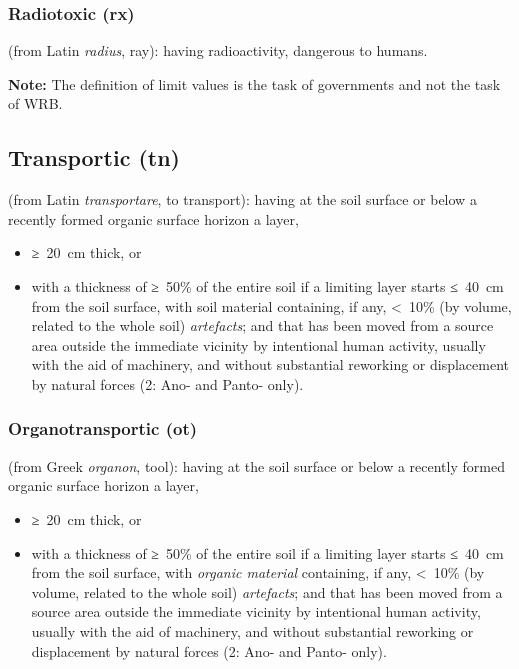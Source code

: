\documentclass[
  letterpaper,
  DIV=11,
  numbers=noendperiod]{scrreprt}
\providecommand{\tightlist}{%
  \setlength{\itemsep}{0pt}\setlength{\parskip}{0pt}}\usepackage{longtable,booktabs,array}
\begin{document}
\hypertarget{radiotoxic-rx}{%
\subsubsection{Radiotoxic (rx)}\label{radiotoxic-rx}}

(from Latin \emph{radius}, ray): having radioactivity, dangerous to
humans.

\textbf{Note:} The definition of limit values is the task of governments
and not the task of WRB.

\hypertarget{transportic-tn}{%
\subsection{Transportic (tn)}\label{transportic-tn}}

(from Latin \emph{transportare}, to transport): having at the soil
surface or below a recently formed organic surface horizon a layer,

\begin{itemize}
\tightlist
\item
  ≥~20~cm thick, or
\item
  with a thickness of ≥~50\% of the entire soil if a limiting layer
  starts ≤~40~cm from the soil surface, with soil material containing,
  if any, \textless~10\% (by volume, related to the whole soil)
  \emph{artefacts}; and that has been moved from a source area outside
  the immediate vicinity by intentional human activity, usually with the
  aid of machinery, and without substantial reworking or displacement by
  natural forces (2: Ano- and Panto- only).
\end{itemize}

\hypertarget{organotransportic-ot}{%
\subsubsection{Organotransportic (ot)}\label{organotransportic-ot}}

(from Greek \emph{organon}, tool): having at the soil surface or below a
recently formed organic surface horizon a layer,

\begin{itemize}
\item
  ≥~20~cm thick, or
\item
  with a thickness of ≥~50\% of the entire soil if a limiting layer
  starts ≤~40~cm from the soil surface, with \emph{organic material}
  containing, if any, \textless~10\% (by volume, related to the whole
  soil) \emph{artefacts}; and that has been moved from a source area
  outside the immediate vicinity by intentional human activity, usually
  with the aid of machinery, and without substantial reworking or
  displacement by natural forces (2: Ano- and Panto- only).
\end{itemize}
\end{document}
